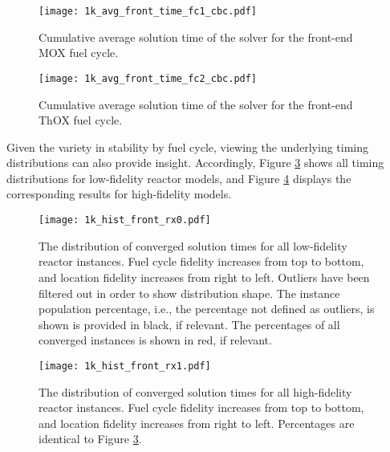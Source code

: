 \begin{figure}[h!]
  \begin{center}
    \texttt{[image: 1k\_avg\_front\_time\_fc1\_cbc.pdf]}
    \caption{
      \label{fig:1k_avg_front_time_fc1_cbc}
      Cumulative average solution time of the \cbc solver for the front-end MOX
      fuel cycle.}
  \end{center}
\end{figure}

\begin{figure}[h!]
  \begin{center}
    \texttt{[image: 1k\_avg\_front\_time\_fc2\_cbc.pdf]}
    \caption{
      \label{fig:1k_avg_front_time_fc2_cbc}
      Cumulative average solution time of the \cbc solver for the front-end ThOX
      fuel cycle.}
  \end{center}
\end{figure}

Given the variety in stability by fuel cycle, viewing the underlying timing
distributions can also provide insight. Accordingly, Figure
\ref{fig:1k_hist_front_rx0} shows all timing distributions for low-fidelity
reactor models, and Figure \ref{fig:1k_hist_front_rx1} displays the
corresponding results for high-fidelity models.

\begin{figure}[h!]
  \begin{center}
    \texttt{[image: 1k\_hist\_front\_rx0.pdf]}
    \caption{
      \label{fig:1k_hist_front_rx0}
      The distribution of converged solution times for all low-fidelity reactor
      instances. Fuel cycle fidelity increases from top to bottom, and location
      fidelity increases from right to left. Outliers have been filtered out in
      order to show distribution shape. The instance population percentage,
      i.e., the percentage not defined as outliers, is shown is provided in
      black, if relevant. The percentages of all converged instances is shown in
      red, if relevant.}
  \end{center}
\end{figure}

\begin{figure}[h!]
  \begin{center}
    \texttt{[image: 1k\_hist\_front\_rx1.pdf]}
    \caption{
      \label{fig:1k_hist_front_rx1}
      The distribution of converged solution times for all high-fidelity reactor
      instances. Fuel cycle fidelity increases from top to bottom, and location
      fidelity increases from right to left. Percentages are identical to Figure
      \ref{fig:1k_hist_front_rx0}.}
  \end{center}
\end{figure}

